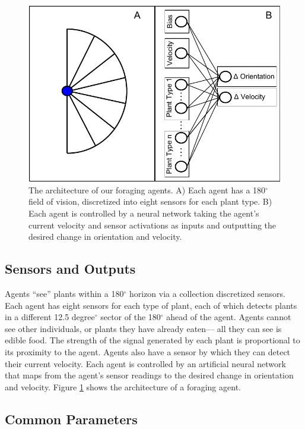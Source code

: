 \documentclass{acm_proc_article-sp}
\begin{document}
\begin{figure}[t]
  \centering
    \includegraphics[scale=.665]{foraging_agent_architecture.pdf}
  \caption{The architecture of our foraging agents. A) Each agent has a 180$^{\circ}$ field of vision, discretized into eight sensors for each plant type. B) Each agent is controlled by a neural network taking the agent's current velocity and sensor activations as inputs and outputting the desired change in orientation and velocity.}
  \label{fig:agent-architecture}
\end{figure}

\subsection*{Sensors and Outputs}

Agents ``see'' plants within a 180$^\circ$ horizon via a collection discretized sensors. Each agent has eight sensors for each type of plant, each of which detects plants in a different 12.5 degree$^\circ$ sector of the 180$^\circ$ ahead of the agent. Agents cannot see other individuals, or plants they have already eaten--- all they can see is edible food. The strength of the signal generated by each plant is proportional to its proximity to the agent. Agents also have a sensor by which they can detect their current velocity. Each agent is controlled by an artificial neural network that maps from the agent's sensor readings to the desired change in orientation and velocity. Figure \ref{fig:agent-architecture} shows the architecture of a foraging agent.

\subsection*{Common Parameters}
\end{document}
